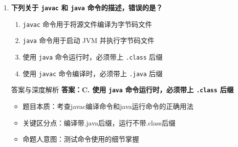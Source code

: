 \documentclass[12pt, a4paper]{ctexart}
\begin{document}
\begin{enumerate}[label=\textbf{\arabic*.}]
\begin{bluebox}{答案与深度解析}
\begin{enumerate}[leftmargin=*, nosep]
			      \item 高频陷阱清单：
			            \begin{itemize}
				            \item 陷阱1：混淆指针与跨平台 → 跨平台靠JVM
				            \item 陷阱2：混淆多重继承与分布式 → 无关概念
			            \end{itemize}
		      \end{enumerate}

		      \begin{itemize}[leftmargin=*, nosep]
			      \item 考场秒杀：
			            \begin{enumerate}
				            \item 取消指针 → 简单安全
				            \item 取消多重继承 → 单继承+多接口
			            \end{enumerate}

			      \item 记忆口诀：简安（简单安全）取（取消）指多
		      \end{itemize}
	      \end{bluebox}

	      \newpage

	\item \textbf{下列关于 \texttt{javac} 和 \texttt{java} 命令的描述，错误的是？}
	      \begin{enumerate}[label=\Alph*.]
		      \item \texttt{javac} 命令用于将源文件编译为字节码文件
		      \item \texttt{java} 命令用于启动 JVM 并执行字节码文件
		      \item 使用 \texttt{java} 命令运行时，必须带上 \texttt{.class} 后缀
		      \item 使用 \texttt{javac} 命令编译时，必须带上 \texttt{.java} 后缀
	      \end{enumerate}

	      \begin{bluebox}{答案与深度解析}
		      \textbf{答案：C. 使用 \texttt{java} 命令运行时，必须带上 \texttt{.class} 后缀}

		      \begin{itemize}[leftmargin=*, nosep]
			      \item 题目本质：考查javac编译命令和java运行命令的正确用法
			      \item 关键区分点：编译带.java后缀，运行不带.class后缀
			      \item 命题人意图：测试命令使用的细节掌握
		      \end{itemize}


\end{bluebox}
\end{enumerate}
\end{document}
